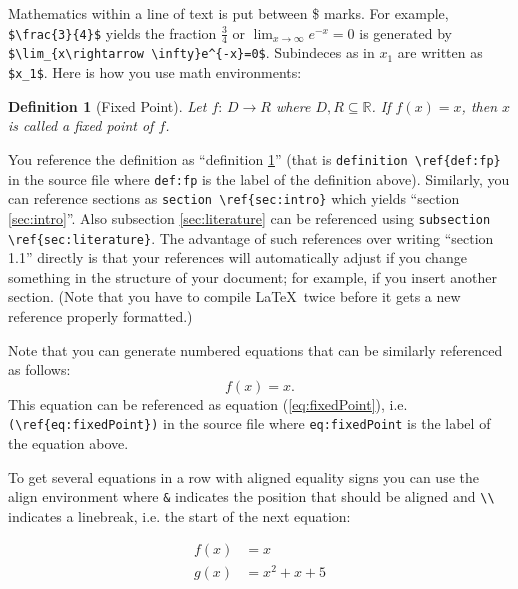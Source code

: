 \documentclass[12pt,a4paper]{article}
\makeatletter
\newtheorem{definition}{Definition}
\renewcommand{\section}{\@startsection{section}{1}{0mm}{-1.5\baselineskip}{0.8\baselineskip}{\normalfont\large\centering}}
\renewcommand{\section}{\@startsection{section}{1}{0mm}{-0.9\baselineskip}{0.5\baselineskip}{\normalfont\large\centering}}
\makeatother
\begin{document}
\section{Mathematics}\label{sec:math}

Mathematics within a line of text is put between \$ marks. For example, \verb|$\frac{3}{4}$| yields the fraction $\frac{3}{4}$ or $\lim_{x\rightarrow \infty}e^{-x}=0$ is generated by\\ %
\verb|$\lim_{x\rightarrow \infty}e^{-x}=0$|. Subindeces as in $x_1$ are written as \verb|$x_1$|. Here is how you use math environments:

\begin{definition}[Fixed Point]\label{def:fp}
  Let $f: \,D\rightarrow R$ where $D,R\subseteq \mathbb{R}$. If $f(x)=x$, then $x$ is called a \emph{fixed point} of $f$.
\end{definition}

You reference the definition as ``definition \ref{def:fp}'' (that is \verb|definition \ref{def:fp}| in the source file where \verb|def:fp| is the label of the definition above). Similarly, you can reference sections as \verb|section \ref{sec:intro}| which yields ``section \ref{sec:intro}''. Also subsection \ref{sec:literature} can be referenced using \verb|subsection \ref{sec:literature}|. The advantage of such references over writing ``section 1.1'' directly is that your references will automatically adjust if you change something in the structure of your document; for example, if you insert another section.
(Note that you have to compile \LaTeX\ twice before it gets a new reference properly formatted.)

Note that you can generate numbered equations that can be similarly referenced as follows:
\begin{equation}
  \label{eq:fixedPoint}
  f(x)=x.
\end{equation}
This equation can be referenced as equation (\ref{eq:fixedPoint}), i.e. \verb|(\ref{eq:fixedPoint})| in the source file where \verb|eq:fixedPoint| is the label of the equation above.

To get several equations in a row with aligned equality signs you can use the align environment where \verb|&| indicates the position that should be aligned and \verb|\\| indicates a linebreak, i.e. the start of the next equation:

\begin{align}
  f(x)&=x \label{eq:f} \\
  g(x)&=x^2+x+5     \label{eq:g}
\end{align}
\end{document}
